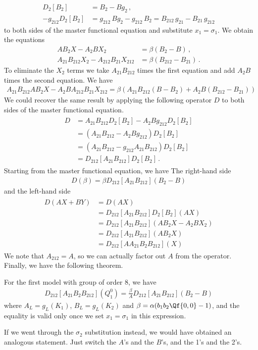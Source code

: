 \begin{align}
	D_2[B_2] &= B_2 - B g_2\,,\\
	- g_{212}D_2[B_2] &= g_{212}\,B g_2 - g_{212}\,B_2 =  B_{212} \,g_{21} - B_{21}\,  g_{212} 
\end{align}
to both sides of the master functional equation and substitute $x_1 = \sigma_1$. We obtain the equations
\begin{align}
	 AB_2 X - A_2 B X_2 &= \beta(B_2 - B)\,,\\
	  A_{21}B_{212} X_2 - A_{212} B_{21} X_{212} &= \beta(B_{212}-B_{21})\,.
\end{align}
To eliminate the $X_2$ terms we take $A_{21}B_{212}$ times the first equation and add $A_2 B$ times the second equation. We have
\begin{align}
	A_{21}B_{212}AB_2 X - A_2 BA_{212} B_{21} X_{212} = \beta(A_{21}B_{212}(B-B_2)+A_2 B(B_{212}-B_{21}))
\end{align}
We could recover the same result by applying the following operator $D$ to both sides of the master functional equation.
\begin{align}\begin{split}
	D &=A_{21}B_{212} D_2[B_2] - A_2 B g_{212}D_2[B_2]\\
	   &= (A_{21}B_{212} - A_2 B g_{212})D_2[B_2]\\
	   &= (A_{21}B_{212} - g_{212}A_{21}B_{212})D_2[B_2]\\
	   &= D_{212}[A_{21}B_{212}]D_2[B_2]\,.
\end{split}\end{align}
Starting from the master functional equation, we have The right-hand side
\begin{align}
	D(\beta) = \beta D_{212}[A_{21}B_{212}](B_2-B)
\end{align}
and the left-hand side
\begin{align}
\begin{split}
		 D(AX+BY) &= D(AX) \\
		&= D_{212}[A_{21}B_{212}]D_2[B_2](AX)\\
		&=D_{212}[A_{21}B_{212}](AB_2X - A_2BX_2)\\
		&=D_{212}[A_{21}B_{212}](AB_2X)\\
		&= D_{212}[AA_{21}B_2B_{212}](X)
\end{split}
\end{align}
We note that $A_{212} = A$, so we can actually factor out $A$ from the operator. Finally, we have the following theorem.
\begin{theorem} For the first model with group of order 8, we have
\begin{align}
	D_{212}[A_{21}B_2B_{212}]\left(Q_1^0\right) = \frac{\beta}{A} D_{212}[A_{21}B_{212}](B_2-B)
\end{align}
where $A_L = g_L(K_1)$, $B_L = g_L(K_2)$ and $\beta = \alpha (b_1b_2\Qf{0,0}-1)$, and the equality is valid only once we set $x_1 = \sigma_1$ in this expression.
\end{theorem}
If we went through the $\sigma_2$ substitution instead, we would have obtained an analogous statement. Just switch the $A$'s and the $B$'s, and the 1's and the 2's.

